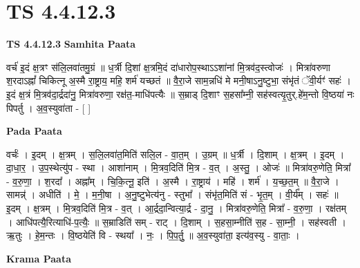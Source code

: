 \documentclass[17pt]{extarticle}
\begin{document}
\section{ TS 4.4.12.3 }

\textbf{TS 4.4.12.3 } \newline
\textbf{Samhita Paata} \newline

वर्च॑ इ॒दं क्ष॒त्रꣳ स॑लि॒लवा॑तमु॒ग्रं ॥ ध॒र्त्री दि॒शां क्ष॒त्रमि॒दं दा॑धारोप॒स्थाऽऽशा॑नां मि॒त्रव॑द॒स्त्वोजः॑ । मित्रा॑वरुणा श॒रदाऽह्नां᳚ चिकित्नू अ॒स्मै रा॒ष्ट्राय॒ महि॒ शर्म॑ यच्छतं ॥ वै॒रा॒जे साम॒न्नधि॑ मे मनी॒षाऽनु॒ष्टुभा॒ संभृ॑तं ॅवी॒र्यꣳ॑ सहः॑ । इ॒दं क्ष॒त्रं मि॒त्रव॑दा॒र्द्रदा॑नु॒ मित्रा॑वरुणा॒ रक्ष॑त॒-माधि॑पत्यैः ॥ स॒म्राड् दि॒शाꣳ स॒हसा᳚म्नी॒ सह॑स्वत्यृ॒तुर्.हे॑म॒न्तो वि॒ष्ठया॑ नः पिपर्तु । अ॒व॒स्युवा॑ता - [  ] \newline

\textbf{Pada Paata} \newline

वर्चः॑ । इ॒दम् । क्ष॒त्रम् । स॒लि॒लवा॑त॒मिति॑ सलि॒ल - वा॒त॒म् । उ॒ग्रम् ॥ ध॒र्त्री । दि॒शाम् । क्ष॒त्रम् । इ॒दम् । दा॒धा॒र॒ । उ॒प॒स्थेत्यु॑प - स्था । आशा॑नाम् । मि॒त्रव॒दिति॑ मि॒त्र - व॒त् । अ॒स्तु॒ । ओजः॑ ॥ मित्रा॑वरु॒णेति॒ मित्रा᳚ - व॒रु॒णा॒ । श॒रदा᳚ । अह्ना᳚म् । चि॒कि॒त्नू॒ इति॑ । अ॒स्मै । रा॒ष्ट्राय॑ । महि॑ । शर्म॑ । य॒च्छ॒त॒म् ॥ वै॒रा॒जे । सामन्न्॑ । अधीति॑ । मे॒ । म॒नी॒षा । अ॒नु॒ष्टुभेत्य॑नु - स्तुभा᳚ । संभृ॑त॒मिति॑ सं - भृ॒त॒म् । वी॒र्य᳚म् । सहः॑ ॥ इ॒दम् । क्ष॒त्रम् । मि॒त्रव॒दिति॑ मि॒त्र - व॒त् । आ॒र्द्रदा॒न्वित्या॒र्द्र - दा॒नु॒ । मित्रा॑वरु॒णेति॒ मित्रा᳚ - व॒रु॒णा॒ । रक्ष॑तम् । आधि॑पत्यै॒रित्याधि॑-प॒त्यैः॒ ॥ स॒म्राडिति॑ सम् - राट् । दि॒शाम् । स॒हसा॒म्नीति॑ स॒ह - सा॒म्नी॒ । सह॑स्वती । ऋ॒तुः । हे॒म॒न्तः । वि॒ष्ठयेति॑ वि - स्थया᳚ । नः॒ । पि॒प॒र्तु॒ ॥ अ॒व॒स्युवा॑ता॒ इत्य॑व॒स्यु - वा॒ताः॒ ।  \newline


\textbf{Krama Paata} \newline
\end{document}
